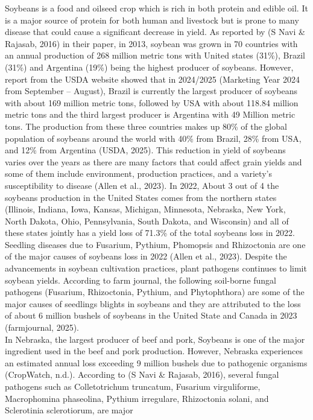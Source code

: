 \documentclass[
  10pt,
  letterpaper,
  twocolumn]{article}
\begin{document}
Soybeans is a food and oilseed crop which is rich in both protein and
edible oil. It is a major source of protein for both human and livestock
but is prone to many disease that could cause a significant decrease in
yield. As reported by (S Navi \& Rajasab, 2016) in their paper, in 2013,
soybean was grown in 70 countries with an annual production of 268
million metric tons with United states (31\%), Brazil (31\%) and
Argentina (19\%) being the highest producer of soybeans. However, report
from the USDA website showed that in 2024/2025 (Marketing Year 2024 from
September -- August), Brazil is currently the largest producer of
soybeans with about 169 million metric tons, followed by USA with about
118.84 million metric tons and the third largest producer is Argentina
with 49 Million metric tons. The production from these three countries
makes up 80\% of the global population of soybeans around the world with
40\% from Brazil, 28\% from USA, and 12\% from Argentina (USDA, 2025).
This reduction in yield of soybeans varies over the years as there are
many factors that could affect grain yields and some of them include
environment, production practices, and a variety's susceptibility to
disease (Allen et al., 2023). In 2022, About 3 out of 4 the soybeans
production in the United States comes from the northern states
(Illinois, Indiana, Iowa, Kansas, Michigan, Minnesota, Nebraska, New
York, North Dakota, Ohio, Pennsylvania, South Dakota, and Wisconsin) and
all of these states jointly has a yield loss of 71.3\% of the total
soybeans loss in 2022. Seedling diseases due to Fusarium, Pythium,
Phomopsis and Rhizoctonia are one of the major causes of soybeans loss
in 2022 (Allen et al., 2023). Despite the advancements in soybean
cultivation practices, plant pathogens continues to limit soybean
yields. According to farm journal, the following soil-borne fungal
pathogens (Fusarium, Rhizoctonia, Pythium, and Phytophthora) are some of
the major causes of seedlings blights in soybeans and they are
attributed to the loss of about 6 million bushels of soybeans in the
United State and Canada in 2023 (farmjournal, 2025).\\
In Nebraska, the largest producer of beef and pork, Soybeans is one of
the major ingredient used in the beef and pork production. However,
Nebraska experiences an estimated annual loss exceeding 9 million
bushels due to pathogenic organisms (CropWatch, n.d.). According to (S
Navi \& Rajasab, 2016), several fungal pathogens such as Colletotrichum
truncatum, Fusarium virguliforme, Macrophomina phaseolina, Pythium
irregulare, Rhizoctonia solani, and Sclerotinia sclerotiorum, are major
\end{document}
